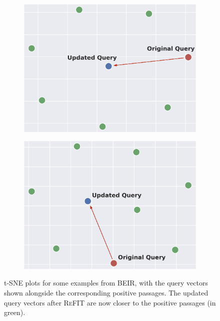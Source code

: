 \begin{figure}[t]
\begin{subfigure}[c]{0.24\linewidth}
     \label{fig:qvec_1}
    \end{subfigure}
    \begin{subfigure}[c]{0.24\linewidth}
        \centering
     \includegraphics[width=1\linewidth]{submissions/Revanth2024/figures/qvec_3.png}
     \label{fig:qvec_1}
    \end{subfigure}
    \begin{subfigure}[c]{0.24\linewidth}
        \centering
     \includegraphics[width=1\linewidth]{submissions/Revanth2024/figures/qvec_4.png}
     \label{fig:qvec_1}
    \end{subfigure}    
    \vspace{-1.5em}
    \caption{t-SNE plots for some examples from BEIR, with the query vectors shown alongside the corresponding positive passages. The updated query vectors after \textsc{ReFIT} are now closer to the positive passages (in green).}
    \label{fig:TSNE}
\end{figure}

